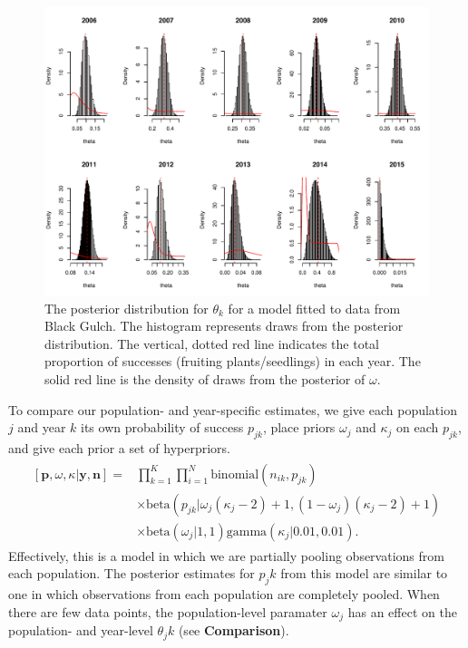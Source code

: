 \documentclass[12pt, oneside, titlepage]{article}   	%
\begin{document}
 \begin{figure}[h]
   \centering
       \includegraphics[page=1,width=.9\textwidth]{../figures/appendix-x-hierarchical2}  
    \caption{ The posterior distribution for $\theta_k$ for a model fitted to data from Black Gulch. The histogram represents draws from the posterior distribution. The vertical, dotted red line indicates the total proportion of successes (fruiting plants/seedlings) in each year. The solid red line is the density of draws from the posterior of $\omega$. }
 \label{fig:hierarchical}
\end{figure}

To compare our population- and year-specific estimates, we give each population $j$ and year $k$ its own probability of success $p_{jk}$, place priors $\omega_j$ and $\kappa_j$ on each $p_{jk}$, and give each prior a set of hyperpriors.
%
\begin{align}
  \begin{split}
[\bm{p},\omega,\kappa|\bm{y},\bm{n}]  = & \prod_{k=1}^K\prod_{i=1}^N \mathrm{binomial}(n_{ik},p_{jk}) 
    \\ & \times \mathrm{beta} (  p_{jk} | \omega_j(\kappa_j-2) +1 , (1-\omega_j) (\kappa_j -2) + 1) 
    \\ & \times \mathrm{beta} ( \omega_j | 1, 1) \mathrm{gamma} ( \kappa_j | 0.01, 0.01)  .
  \end{split}
\end{align}
%
Effectively, this is a model in which we are partially pooling observations from each population. The posterior estimates for $p_jk$ from this model are similar to one in which observations from each population are completely pooled. When there are few data points, the population-level paramater $\omega_j$ has an effect on the population- and year-level $\theta_jk$ (see \textbf{Comparison}).
\end{document}
